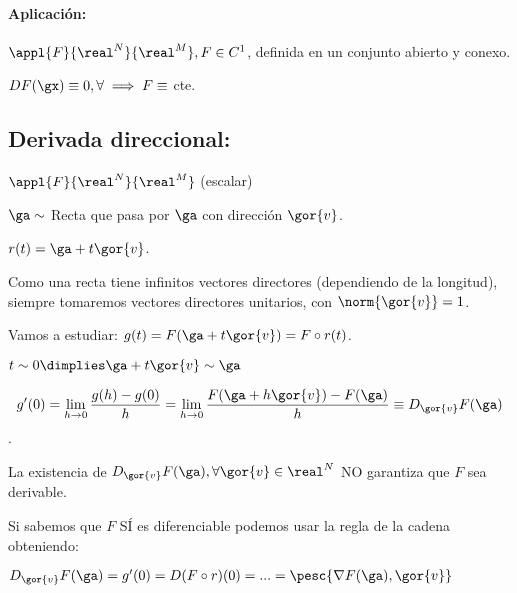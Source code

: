 \paragraph{Aplicación:\\}

$\appl{F}{\real^N}{\real^M}, F \in C^1$, definida en un conjunto abierto y conexo.

$DF(\gx) \equiv 0, \forall \implies F \equiv $ cte.	

\subsection{Derivada direccional: }

$\appl{F}{\real^N}{\real^M}$ (escalar)

$\ga \sim$ Recta que pasa por $\ga$ con dirección $\gor{v}$.

$r(t) = \ga + t\gor{v}$. 

\obs
Como una recta tiene infinitos vectores directores (dependiendo de la longitud), siempre tomaremos vectores directores unitarios, con $\norm{\gor{v}} = 1$.


Vamos a estudiar: $g(t) = F(\ga + t\gor{v}) = F \circ r (t)$.

$t \sim 0 \dimplies \ga + t\gor{v} \sim \ga$
\begin{defn} 
$$g'(0) = \displaystyle\lim_{h \rightarrow 0} \frac{g(h)-g(0)}{h} = \displaystyle\lim_{h \rightarrow 0} \frac{F(\ga+h\gor{v})-F(\ga)}{h} \equiv D_{\gor{v}}F(\ga)$$. 
\end{defn}

\obs
La existencia de $D_{\gor{v}}F(\ga), \forall \gor{v}\in \real^N$ NO garantiza que $F$ sea derivable.


Si sabemos que $F$ SÍ es diferenciable podemos usar la regla de la cadena obteniendo:

$D_{\gor{v}}F(\ga) = g'(0) = D(F\circ r)(0) = ... = \pesc{\nabla F(\ga),\gor{v}}$


